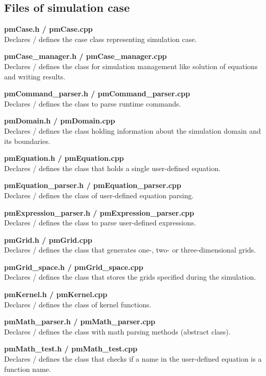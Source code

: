 \documentclass[a4paper,12pt,openany]{book}
\theoremstyle{break}
\begin{document}
\subsection{Files of simulation case}

\textbf{pmCase.h / pmCase.cpp} \\
Declares / defines the case class representing  simulation case.

\textbf{pmCase\_manager.h / pmCase\_manager.cpp} \\
Declares / defines the class for simulation management like solution of equations and writing results.

\textbf{pmCommand\_parser.h / pmCommand\_parser.cpp} \\
Declares / defines the class to parse runtime commands.

\textbf{pmDomain.h / pmDomain.cpp} \\
Declares / defines the class holding information about the simulation domain and its boundaries.

\textbf{pmEquation.h / pmEquation.cpp} \\
Declares / defines the class that holds a single user-defined equation.

\textbf{pmEquation\_parser.h / pmEquation\_parser.cpp} \\
Declares / defines the class of user-defined equation parsing.

\textbf{pmExpression\_parser.h / pmExpression\_parser.cpp} \\
Declares / defines the class to parse user-defined expressions.

\textbf{pmGrid.h / pmGrid.cpp} \\
Declares / defines the class that generates one-, two- or three-dimensional grids.

\textbf{pmGrid\_space.h / pmGrid\_space.cpp} \\
Declares / defines the class that stores the grids specified during the simulation.

\textbf{pmKernel.h / pmKernel.cpp} \\
Declares / defines the class of kernel functions.

\textbf{pmMath\_parser.h / pmMath\_parser.cpp} \\
Declares / defines the class with math parsing methods (abstract class).

\textbf{pmMath\_test.h / pmMath\_test.cpp} \\
Declares / defines the class that checks if a name in the user-defined equation is a function name.
\end{document}
